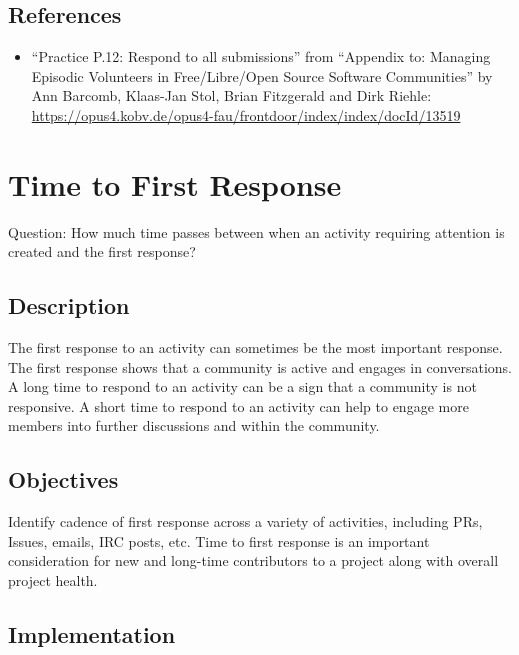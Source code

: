 \documentclass[
  12pt,
]{article}
\providecommand{\tightlist}{%
  \setlength{\itemsep}{0pt}\setlength{\parskip}{0pt}}
\begin{document}
\hypertarget{references-5}{%
\subsection{References}\label{references-5}}

\begin{itemize}
\tightlist
\item
  ``Practice P.12: Respond to all submissions'' from ``Appendix to:
  Managing Episodic Volunteers in Free/Libre/Open Source Software
  Communities'' by Ann Barcomb, Klaas-Jan Stol, Brian Fitzgerald and
  Dirk Riehle:
  \url{https://opus4.kobv.de/opus4-fau/frontdoor/index/index/docId/13519}
\end{itemize}

\hypertarget{time-to-first-response}{%
\section{Time to First Response}\label{time-to-first-response}}

Question: How much time passes between when an activity requiring
attention is created and the first response?

\hypertarget{description-6}{%
\subsection{Description}\label{description-6}}

The first response to an activity can sometimes be the most important
response. The first response shows that a community is active and
engages in conversations. A long time to respond to an activity can be a
sign that a community is not responsive. A short time to respond to an
activity can help to engage more members into further discussions and
within the community.

\hypertarget{objectives-6}{%
\subsection{Objectives}\label{objectives-6}}

Identify cadence of first response across a variety of activities,
including PRs, Issues, emails, IRC posts, etc. Time to first response is
an important consideration for new and long-time contributors to a
project along with overall project health.

\hypertarget{implementation-6}{%
\subsection{Implementation}\label{implementation-6}}
\end{document}
